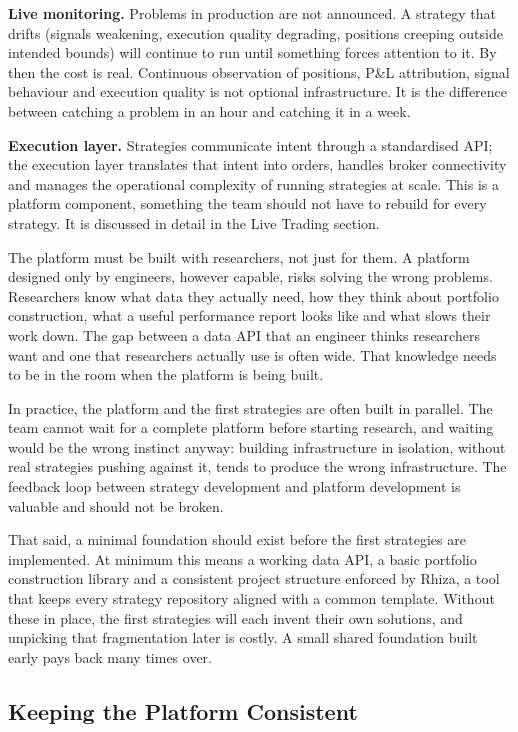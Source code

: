 \documentclass[
  11pt,
]{article}
\begin{document}
\textbf{Live monitoring.} Problems in production are not announced. A
strategy that drifts (signals weakening, execution quality degrading,
positions creeping outside intended bounds) will continue to run
until something forces attention to it. By then the cost is real.
Continuous observation of positions, P\&L attribution, signal behaviour
and execution quality is not optional infrastructure. It is the
difference between catching a problem in an hour and catching it in a
week.

\textbf{Execution layer.} Strategies communicate intent through a
standardised API; the execution layer translates that intent into
orders, handles broker connectivity and manages the operational
complexity of running strategies at scale. This is a platform component,
something the team should not have to rebuild for every strategy. It
is discussed in detail in the Live Trading section.

The platform must be built with researchers, not just for them. A
platform designed only by engineers, however capable, risks solving the
wrong problems. Researchers know what data they actually need, how they
think about portfolio construction, what a useful performance report
looks like and what slows their work down. The gap between a data API
that an engineer thinks researchers want and one that researchers
actually use is often wide. That knowledge needs to be in the room when
the platform is being built.

In practice, the platform and the first strategies are often built in
parallel. The team cannot wait for a complete platform before starting
research, and waiting would be the wrong instinct anyway: building
infrastructure in isolation, without real strategies pushing against it,
tends to produce the wrong infrastructure. The feedback loop between
strategy development and platform development is valuable and should not
be broken.

That said, a minimal foundation should exist before the first strategies
are implemented. At minimum this means a working data API, a basic
portfolio construction library and a consistent project structure
enforced by Rhiza, a tool that keeps every strategy repository
aligned with a common template. Without these in place, the first
strategies will each invent their own solutions, and unpicking that
fragmentation later is costly. A small shared foundation built early
pays back many times over.

\subsection{Keeping the Platform
Consistent}\label{keeping-the-platform-consistent}
\end{document}

